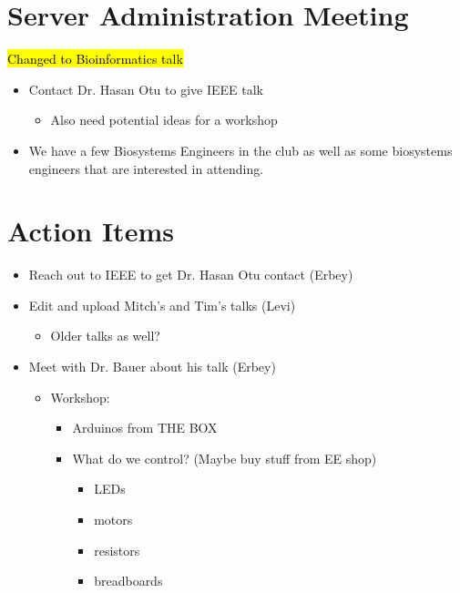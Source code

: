 \section*{Server Administration Meeting}
\hl{Changed to Bioinformatics talk}
    \begin{itemize}
         \item Contact Dr. Hasan Otu to give IEEE talk
         \begin{itemize}
             \item Also need potential ideas for a workshop
         \end{itemize}
         \item We have a few Biosystems Engineers in the club as well as some biosystems engineers that are interested in attending.
    \end{itemize}

\section*{Action Items}
    \begin{itemize}
        \item Reach out to IEEE to get Dr. Hasan Otu contact (Erbey)
        \item Edit and upload Mitch's and Tim's talks (Levi)
        \begin{itemize}
            \item Older talks as well?
        \end{itemize}
        \item Meet with Dr. Bauer about his talk (Erbey)
            \begin{itemize}
                \item Workshop:
                \begin{itemize}
                    \item Arduinos from THE BOX
                    \item What do we control? (Maybe buy stuff from EE shop)
                    \begin{itemize}
                        \item LEDs
                        \item motors
                        \item resistors
                        \item breadboards
                    \end{itemize}
                \end{itemize}
            \end{itemize}
    \end{itemize}

